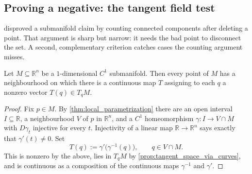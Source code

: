\begin{center}
\end{center}

\subsection{Proving a negative: the tangent field test}

 disproved a submanifold claim by counting connected components
after deleting a point. That argument is sharp but narrow: it needs the bad point to disconnect
the set. A second, complementary criterion catches cases the counting argument misses.

\begin{proposition}
\label{prop:continuous_tangent_field}
Let $M \subseteq \mathbb{R}^n$ be a $1$-dimensional $C^1$ submanifold. Then every point of $M$
has a neighbourhood on which there is a continuous map $T$ assigning to each $q$ a nonzero vector
$T(q) \in T_qM$.
\end{proposition}

\begin{proof}
Fix $p \in M$. By \cref{thm:local_parametrization} there are an open interval $I \subseteq
\mathbb{R}$, a neighbourhood $V$ of $p$ in $\mathbb{R}^n$, and a $C^1$ homeomorphism
$\gamma : I \to V \cap M$ with $D\gamma_t$ injective for every $t$. Injectivity of a linear map
$\mathbb{R} \to \mathbb{R}^n$ says exactly that $\gamma'(t) \neq 0$. Set
\[T(q) := \gamma'\big(\gamma^{-1}(q)\big), \qquad q \in V \cap M.\]
This is nonzero by the above, lies in $T_qM$ by \cref{prop:tangent_space_via_curves}, and is
continuous as a composition of the continuous maps $\gamma^{-1}$ and $\gamma'$.
\end{proof}

